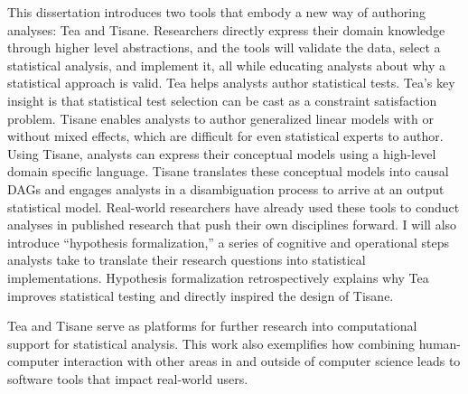 This dissertation introduces two tools that embody a new way of authoring
analyses: Tea and Tisane. Researchers directly express their domain knowledge
through higher level abstractions, and the tools will validate the data, select
a statistical analysis, and implement it, all while educating analysts about why
a statistical approach is valid. Tea helps analysts author statistical tests.
Tea’s key insight is that statistical test selection can be cast as a constraint
satisfaction problem. Tisane enables analysts to author generalized linear
models with or without mixed effects, which are difficult for even statistical
experts to author. Using Tisane, analysts can express their conceptual models
using a high-level domain specific language. Tisane translates these conceptual
models into causal DAGs and engages analysts in a disambiguation process to
arrive at an output statistical model. Real-world researchers have already used
these tools to conduct analyses in published research that push their own
disciplines forward. I will also introduce “hypothesis formalization,” a series
of cognitive and operational steps analysts take to translate their research
questions into statistical implementations. Hypothesis formalization
retrospectively explains why Tea improves statistical testing and directly
inspired the design of Tisane. 

Tea and Tisane serve as platforms for further research into computational
support for statistical analysis. This work also exemplifies how combining
human-computer interaction with other areas in and outside of computer science
leads to software tools that impact real-world users.
